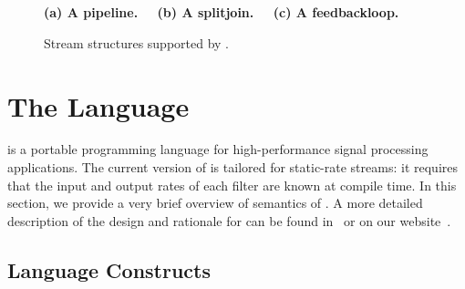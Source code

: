 \begin{figure}[t]
\begin{center}
\begin{comment}
\hspace{0.1in}
\psfig{figure=radio-ascoded.eps, width=2.8in}
\vspace{-36pt}
\caption{\protect\small Block diagram of the FM Radio.
\protect\label{fig:radio-ascoded}}
\vspace{10pt}
~~
\end{comment}
\begin{minipage}{0.46in}
\centering
{} \\
\end{minipage}
~
\begin{minipage}{1.3in}
\centering
{} \\
\end{minipage}
~
\begin{minipage}{1.02in}
\centering
{} \\
\end{minipage}
\\ ~ \\ {\bf \protect\small (a) A pipeline. ~~(b) A splitjoin. ~~(c) A feedbackloop.}
\caption{\protect\small Stream structures supported by {\StreamIt}.
\protect\label{fig:structures}} \vspace{-12pt}
\end{center}
\vspace{-12pt}
\end{figure}

\section{The {\StreamIt} Language}
\label{sec:streamit}

{\StreamIt} is a portable programming language for high-performance
signal processing applications.  The current version of {\StreamIt}
is tailored for static-rate streams: it requires that the input
and output rates of each filter are known at compile time.  In
this section, we provide a very brief overview of
semantics of {\StreamIt}.  A more detailed description of the design
and rationale for {\StreamIt} can be found in~\cite{thies02streamit} or
on our website~\cite{streamitweb}.

\subsection{Language Constructs}

